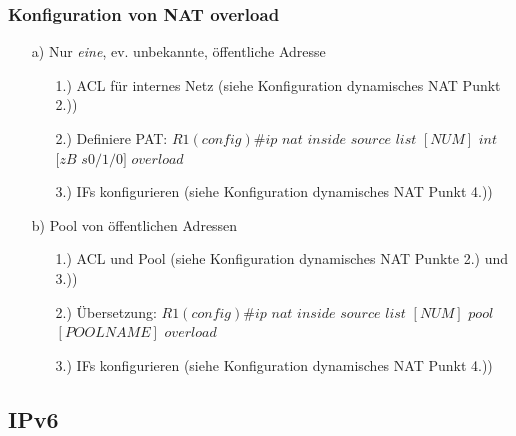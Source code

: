 \documentclass[landscape,twocolumn,a4paper]{article}
\begin{document}
\begin{footnotesize}
\subsubsection{Konfiguration von NAT overload}
\begin{itemize}
	\item[a)] Nur \textit{eine}, ev. unbekannte, öffentliche Adresse
	\begin{itemize}
		\item[1.)] ACL für internes Netz (siehe Konfiguration dynamisches NAT Punkt 2.))
		\item[2.)] Definiere PAT: $R1(config)\#ip$ $nat$ $inside$ $source$ $list$ $[NUM]$ $int$ $[zB$ $s0/1/0]$ $overload$
		\item[3.)] IFs konfigurieren (siehe Konfiguration dynamisches NAT Punkt 4.))
	\end{itemize}
	\item[b)] Pool von öffentlichen Adressen
	\begin{itemize}
		\item[1.)] ACL und Pool (siehe Konfiguration dynamisches NAT Punkte 2.) und 3.))
		\item[2.)] Übersetzung: $R1(config)\#ip$ $nat$ $inside$ $source$ $list$ $[NUM]$ $pool$ $[POOLNAME]$ $overload$
		\item[3.)] IFs konfigurieren (siehe Konfiguration dynamisches NAT Punkt 4.))
	\end{itemize}
\end{itemize}

\subsection{IPv6}

\end{footnotesize}
\end{document}
